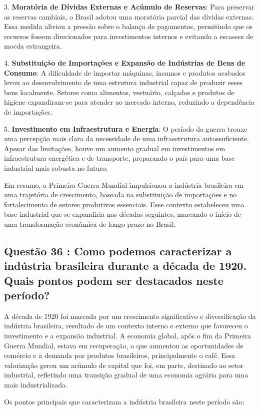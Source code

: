 \documentclass[a4paper,12pt]{article}[abntex2]
\begin{document}
3. \textbf{Moratória de Dívidas Externas e Acúmulo de Reservas}: Para preservar as reservas cambiais, o Brasil adotou uma moratória parcial das dívidas externas. Essa medida aliviou a pressão sobre o balanço de pagamentos, permitindo que os recursos fossem direcionados para investimentos internos e evitando a escassez de moeda estrangeira.

4. \textbf{Substituição de Importações e Expansão de Indústrias de Bens de Consumo}: A dificuldade de importar máquinas, insumos e produtos acabados levou ao desenvolvimento de uma estrutura industrial capaz de produzir esses bens localmente. Setores como alimentos, vestuário, calçados e produtos de higiene expandiram-se para atender ao mercado interno, reduzindo a dependência de importações.

5. \textbf{Investimento em Infraestrutura e Energia}: O período da guerra trouxe uma percepção mais clara da necessidade de uma infraestrutura autossuficiente. Apesar das limitações, houve um aumento gradual em investimentos em infraestrutura energética e de transporte, preparando o país para uma base industrial mais robusta no futuro.

Em resumo, a Primeira Guerra Mundial impulsionou a indústria brasileira em uma trajetória de crescimento, baseada na substituição de importações e no fortalecimento de setores produtivos essenciais. Esse contexto estabeleceu uma base industrial que se expandiria nas décadas seguintes, marcando o início de uma transformação econômica de longo prazo no Brasil.
    
\subsection{\textbf{Questão 36 : Como podemos caracterizar a indústria brasileira durante a década de 1920. Quais pontos podem ser destacados neste período?}}

A década de 1920 foi marcada por um crescimento significativo e diversificação da indústria brasileira, resultado de um contexto interno e externo que favoreceu o investimento e a expansão industrial. A economia global, após o fim da Primeira Guerra Mundial, estava em recuperação, o que aumentou as oportunidades de comércio e a demanda por produtos brasileiros, principalmente o café. Essa valorização gerou um acúmulo de capital que foi, em parte, destinado ao setor industrial, refletindo uma transição gradual de uma economia agrária para uma mais industrializada.

Os pontos principais que caracterizam a indústria brasileira neste período são:
\end{document}
